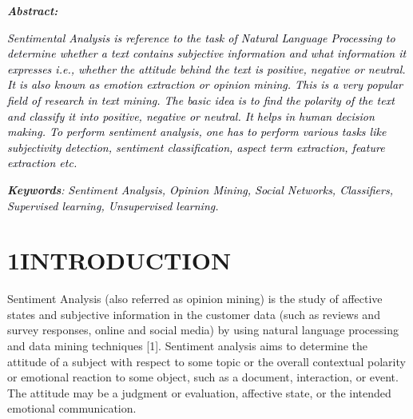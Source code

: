 \documentclass[12pt]{article}
\begin{document}
\begin{justify}
{\fontsize{14pt}{16.8pt}\selectfont \textbf{\textit{Abstract:}}\par}
\end{justify}\par

\begin{justify}
\textit{\textcolor[HTML]{00000A}{Sentimental Analysis is reference to the task of Natural Language Processing to determine whether a text contains subjective information and what information it expresses i.e., whether the attitude behind the text is positive, negative or neutral. It is also known as emotion extraction or opinion mining. This is a very popular field of research in text mining. The basic idea is to find the polarity of the text and classify it into positive, negative or neutral. It helps in human decision making. To perform sentiment analysis, one has to perform various tasks like subjectivity detection, sentiment classification, aspect term extraction, feature extraction etc.}}
\end{justify}\par


\vspace{\baselineskip}
\begin{justify}
{\fontsize{14pt}{16.8pt}\selectfont \textbf{\textit{Keywords}}\textit{:} \textit{\textcolor[HTML]{00000A}{Sentiment Analysis, Opinion Mining, Social Networks, Classifiers, Supervised learning, Unsupervised learning.}}\par}
\end{justify}\par


\vspace{\baselineskip}
\begin{justify}
\textit{\textcolor[HTML]{00000A}{ }}
\end{justify}\par


\newpage



\newpage

\vspace{\baselineskip}\section*{ 1\hspace*{10pt}INTRODUCTION}
\begin{justify}
\tab Sentiment Analysis (also referred as opinion mining) is the study of affective states and subjective information in the customer data (such as reviews and survey responses, online and social media) by using natural language processing and data mining techniques [1]. Sentiment analysis aims to determine the attitude of a subject with respect to some topic or the overall contextual polarity or emotional reaction to some object, such as a document, interaction, or event. The attitude may be a judgment or evaluation, affective state, or the intended emotional communication.
\end{justify}\par
\end{document}
